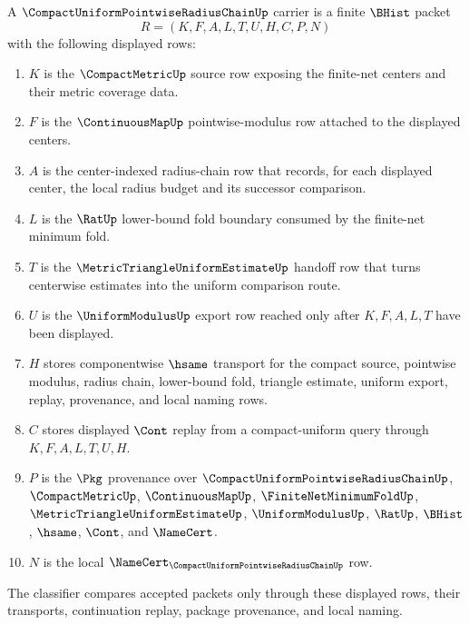 \begin{definition}
\label{def:compact-uniform-pointwise-radius-chain-carrier}
A $\CompactUniformPointwiseRadiusChainUp$ carrier is a finite $\BHist$ packet
$$
R=(K,F,A,L,T,U,H,C,P,N)
$$
with the following displayed rows:
\begin{enumerate}
\item $K$ is the $\CompactMetricUp$ source row exposing the finite-net centers and their metric coverage data.
\item $F$ is the $\ContinuousMapUp$ pointwise-modulus row attached to the displayed centers.
\item $A$ is the center-indexed radius-chain row that records, for each displayed center, the local radius budget and its successor comparison.
\item $L$ is the $\RatUp$ lower-bound fold boundary consumed by the finite-net minimum fold.
\item $T$ is the $\MetricTriangleUniformEstimateUp$ handoff row that turns centerwise estimates into the uniform comparison route.
\item $U$ is the $\UniformModulusUp$ export row reached only after $K,F,A,L,T$ have been displayed.
\item $H$ stores componentwise $\hsame$ transport for the compact source, pointwise modulus, radius chain, lower-bound fold, triangle estimate, uniform export, replay, provenance, and local naming rows.
\item $C$ stores displayed $\Cont$ replay from a compact-uniform query through $K,F,A,L,T,U,H$.
\item $P$ is the $\Pkg$ provenance over $\CompactUniformPointwiseRadiusChainUp$, $\CompactMetricUp$, $\ContinuousMapUp$, $\FiniteNetMinimumFoldUp$, $\MetricTriangleUniformEstimateUp$, $\UniformModulusUp$, $\RatUp$, $\BHist$, $\hsame$, $\Cont$, and $\NameCert$.
\item $N$ is the local $\NameCert_{\CompactUniformPointwiseRadiusChainUp}$ row.
\end{enumerate}
The classifier compares accepted packets only through these displayed rows, their transports, continuation replay, package provenance, and local naming.
\end{definition}

